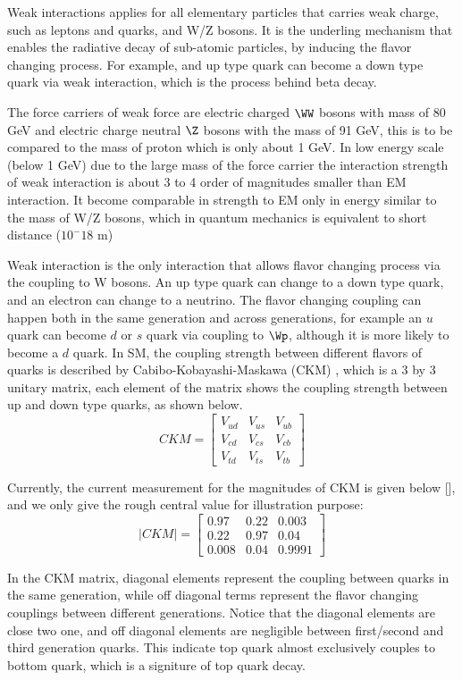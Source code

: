 Weak interactions applies for all elementary particles that carries weak charge, such as leptons and quarks, and W/Z bosons. It is the underling mechanism that enables the radiative decay of sub-atomic particles, by inducing the flavor changing process. For example, and up type quark can become a down type quark via weak interaction, which is the process behind beta decay. 

The force carriers of weak force are electric charged $\WW$ bosons with mass of 80 GeV and electric charge neutral $\Z$ bosons with the mass of 91 GeV, this is to be compared to the mass of proton which is only about 1 GeV. In low energy scale (below 1 GeV) due to the large mass of the force carrier the interaction strength of weak interaction is about 3 to 4 order of magnitudes smaller than EM interaction. It become comparable in strength to EM only in energy similar to the mass of W/Z bosons, which in quantum mechanics is equivalent to short distance ($10^-18$ m) 

Weak interaction is the only interaction that allows flavor changing process via the coupling to W bosons. An up type quark can change to a down type quark, and an electron can change to a neutrino. The flavor changing coupling can happen both in the same generation and across generations, for example an $u$ quark can become $d$ or $s$ quark via coupling to $\Wp$, although it is more likely to become a $d$ quark. In SM, the coupling strength between different flavors of quarks is described by Cabibo-Kobayashi-Maskawa (CKM) , which is a 3 by 3 unitary matrix, each element of the matrix shows the coupling strength between up and down type quarks, as shown below.
\[
CKM = 
\begin{bmatrix}
	V_{ud} & V_{us} & V_{ub}\\
	V_{cd} & V_{cs} & V_{cb} \\
	V_{td} & V_{ts} & V_{tb} 
\end{bmatrix}
\]

Currently, the current measurement for the magnitudes of CKM is given below [], and we only give the rough central value for illustration purpose:
\[
|CKM| = 
\begin{bmatrix}
	0.97 & 0.22 & 0.003  \\
	0.22 & 0.97 & 0.04 \\
	0.008 & 0.04 & 0.9991 
\end{bmatrix}
\]

In the CKM matrix, diagonal elements represent the coupling between quarks in the same generation, while off diagonal terms represent the flavor changing couplings between different generations. Notice that the diagonal elements are close two one, and off diagonal elements are negligible between first/second and third generation quarks. This indicate top quark almost exclusively couples to bottom quark, which is a signiture of top quark decay.


